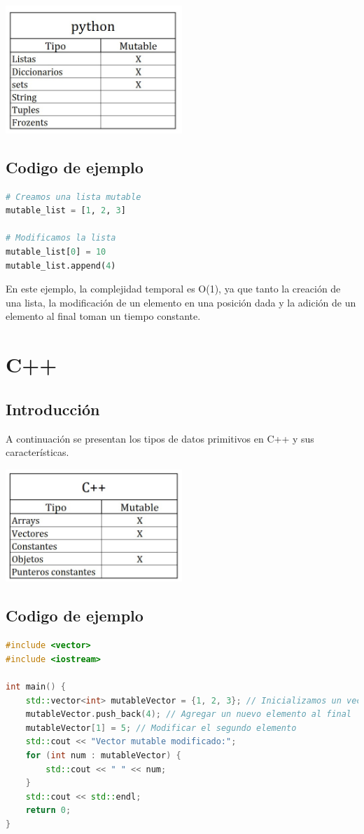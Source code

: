 \documentclass{article}
\begin{document}
\includegraphics[width=0.5\textwidth]{pythonTabla.jpg}

\subsection{Codigo de ejemplo}
\begin{lstlisting}[language=Python, caption=Ejemplo de código en Python]
# Creamos una lista mutable
mutable_list = [1, 2, 3]

# Modificamos la lista
mutable_list[0] = 10
mutable_list.append(4)
\end{lstlisting}

En este ejemplo, la complejidad temporal es O(1), ya que tanto la creación de una lista, la modificación de un elemento en una posición dada y la adición de un elemento al final toman un tiempo constante.

\section{C++}
\subsection{Introducción}
A continuación se presentan los tipos de datos primitivos en C++ y sus características.

\includegraphics[width=0.5\textwidth]{c++Tabla.jpg}

\subsection{Codigo de ejemplo}
\begin{lstlisting}[language=C++, caption=Ejemplo de código en C++]
#include <vector>
#include <iostream>

int main() {
    std::vector<int> mutableVector = {1, 2, 3}; // Inicializamos un vector mutable
    mutableVector.push_back(4); // Agregar un nuevo elemento al final
    mutableVector[1] = 5; // Modificar el segundo elemento
    std::cout << "Vector mutable modificado:";
    for (int num : mutableVector) {
        std::cout << " " << num;
    }
    std::cout << std::endl;
    return 0;
}
\end{lstlisting}
\end{document}
